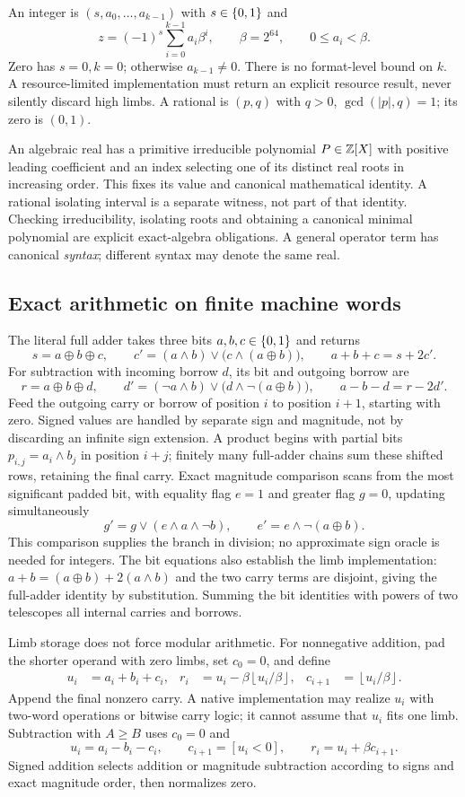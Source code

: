 An integer is $(s,a_0,\ldots,a_{k-1})$ with $s\in\{0,1\}$ and
\[
 z=(-1)^s\sum_{i=0}^{k-1}a_i\beta^i,
 \qquad \beta=2^{64},\qquad 0\le a_i<\beta.
\]
Zero has $s=0,k=0$; otherwise $a_{k-1}\ne0$. There is no format-level bound on
$k$. A resource-limited implementation must return an explicit resource result,
never silently discard high limbs. A rational is $(p,q)$ with $q>0$,
$\gcd(|p|,q)=1$; its zero is $(0,1)$.

An algebraic real has a primitive irreducible polynomial $P\in\mathbb Z[X]$ with
positive leading coefficient and an index selecting one of its distinct real
roots in increasing order. This fixes its value and canonical mathematical
identity. A rational isolating interval is a separate witness, not part of that
identity. Checking irreducibility, isolating roots and obtaining a canonical
minimal polynomial are explicit exact-algebra obligations. A general operator
term has canonical \emph{syntax}; different syntax may denote the same real.

\subsection{Exact arithmetic on finite machine words}
The literal full adder takes three bits $a,b,c\in\{0,1\}$ and returns
\[
 s=a\oplus b\oplus c,\qquad
 c'= (a\land b)\lor\bigl(c\land(a\oplus b)\bigr),
 \qquad a+b+c=s+2c'.
\]
For subtraction with incoming borrow $d$, its bit and outgoing borrow are
\[
 r=a\oplus b\oplus d,\qquad
 d'=(\neg a\land b)\lor\bigl(d\land\neg(a\oplus b)\bigr),
 \qquad a-b-d=r-2d'.
\]
Feed the outgoing carry or borrow of position $i$ to position $i+1$, starting
with zero. Signed values are handled by separate sign and magnitude, not by
discarding an infinite sign extension. A product begins with partial bits
$p_{i,j}=a_i\land b_j$ in position $i+j$; finitely many full-adder chains sum
these shifted rows, retaining the final carry. Exact magnitude comparison scans
from the most significant padded bit, with equality flag $e=1$ and greater flag
$g=0$, updating simultaneously
\[
 g'=g\lor(e\land a\land\neg b),\qquad
 e'=e\land\neg(a\oplus b).
\]
This comparison supplies the branch in division; no approximate sign oracle is
needed for integers. The bit equations also establish the limb implementation:
$a+b=(a\oplus b)+2(a\land b)$ and the two carry terms are disjoint, giving
the full-adder identity by substitution. Summing the bit identities with powers
of two telescopes all internal carries and borrows.

Limb storage does not force modular arithmetic. For nonnegative addition, pad
the shorter operand with zero limbs, set $c_0=0$, and define
\begin{align*}
 u_i&=a_i+b_i+c_i,&
 r_i&=u_i-\beta\left\lfloor u_i/\beta\right\rfloor,&
 c_{i+1}&=\left\lfloor u_i/\beta\right\rfloor.
\end{align*}
Append the final nonzero carry. A native implementation may realize $u_i$ with
two-word operations or bitwise carry logic; it cannot assume that $u_i$ fits one
limb. Subtraction with $A\ge B$ uses $c_0=0$ and
\[
 u_i=a_i-b_i-c_i,\qquad
 c_{i+1}=[u_i<0],\qquad r_i=u_i+\beta c_{i+1}.
\]
Signed addition selects addition or magnitude subtraction according to signs
and exact magnitude order, then normalizes zero.

